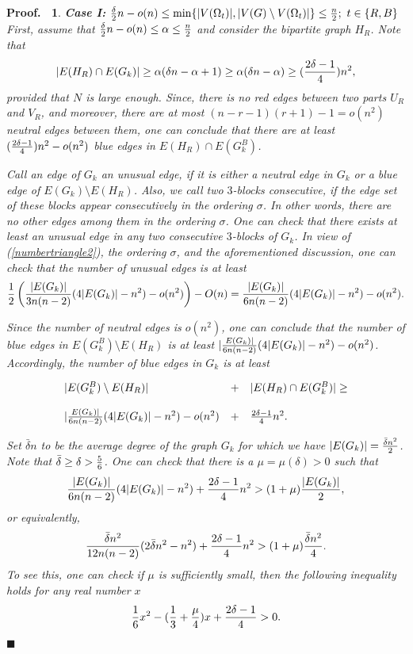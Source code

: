 \documentclass[11pt]{article}
\newtheorem{preproof}{{\bf Proof.\ }}
\newenvironment{proof}[1]{\begin{preproof}{\rm
               #1}\hfill{$\blacksquare$}}{\end{preproof}}
\begin{document}
\begin{proof}
{%
{\bf Case I:} ${\delta\over 2}n-o(n)\leq \min\{|V(\Omega_t)|, |V(G) \setminus V(\Omega_t)|\} \leq {n\over 2};\ t\in \{R,B\}$\\
First,  assume that 
${\delta\over 2}n-o(n)\leq \alpha\leq {n\over 2}$ and consider the bipartite graph $H_R$. Note that  
$$|E(H_R)\cap E(G_k)|\geq \alpha({\delta n}-\alpha+1)\geq  \alpha({\delta n}-\alpha)\geq ({2\delta-1\over 4})n^2,$$ 
provided that $N$ is large enough. 
Since, there is no red edges between two parts  $U_R$ and $V_R$, and moreover,  
there are at most $(n-r-1)(r+1)-1=o(n^2)$ neutral edges between them, one can conclude that there are at least $({2\delta-1\over 4})n^2-o(n^2)$ blue edges in $E(H_R)\cap E(G^B_k)$. 

Call an edge of $G_k$ an {\it unusual} edge, if it is either a neutral edge in $G_k$ or a blue edge of $E(G_k)\setminus E(H_R)$. 
Also, we call two $3$-blocks {\it consecutive}, if the edge set of these blocks appear 
consecutively in the ordering $\sigma$. In other words, there are no other edges among them in the ordering $\sigma$. 
One can check that there exists at least an unusual edge in any two consecutive $3$-blocks of $G_k$. 
In view of (\ref{numbertriangle2}), the ordering $\sigma$, and the aforementioned discussion, one can check that the number of unusual edges is at least 
$${1\over 2}\left({|E(G_k)|\over 3n(n-2)}(4|E(G_k)|-n^2)-o(n^2)\right)-O(n)={|E(G_k)|\over 6n(n-2)}(4|E(G_k)|-n^2)-o(n^2).$$ 

Since the number of neutral edges is $o(n^2)$,  one can conclude that the number of blue edges in $E(G^B_k)\setminus E(H_R)$ is at least $|{E(G_k)|\over 6n(n-2)}(4|E(G_k)|-n^2)-o(n^2)$. Accordingly, the number of blue edges in $G_k$ is 
at least 

$$\begin{array}{lll}
|E(G^B_k)\setminus E(H_R)| & + & |E(H_R)\cap E(G_k^B)| \geq \\
&&\\
|{E(G_k)|\over 6n(n-2)}(4|E(G_k)|-n^2)-o(n^2) & + & {2\delta -1 \over 4}n^2.
\end{array}$$

Set $\bar{\delta}n$ to be the average degree of the graph $G_k$ for which we have $|E(G_k)|={\bar{\delta}n^2\over 2}$. 
Note that $\bar{\delta}\geq \delta>{5\over 6}$. One can check that  there is a $\mu=\mu(\delta)>0$ such that 
$${|E(G_k)|\over 6n(n-2)}(4|E(G_k)|-n^2)+{2\delta -1 \over 4}n^2 > (1+\mu){|E(G_k)|\over 2},$$ 
or equivalently,  
$${\bar{\delta}n^2\over 12n(n-2)}(2\bar{\delta}n^2-n^2)+{2\delta -1 \over 4}n^2 > (1+\mu){\bar{\delta}n^2\over 4}.$$
To see this, one can check if $\mu$ is sufficiently small, then the following inequality holds for any real number $x$ 
$${1\over 6}x^2-({1\over 3}+ {\mu\over 4})x+{2\delta -1 \over 4}>0.$$

}
\end{proof}
\end{document}
